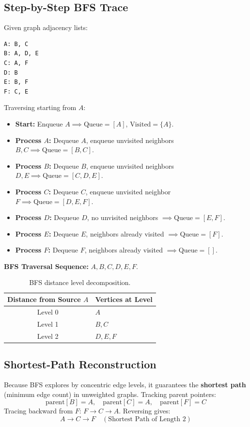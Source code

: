 \subsection{Step-by-Step BFS Trace}
Given graph adjacency lists:
\begin{lstlisting}[style=pseudocode]
A: B, C
B: A, D, E
C: A, F
D: B
E: B, F
F: C, E
\end{lstlisting}
Traversing starting from $A$:
\begin{itemize}
    \item \textbf{Start:} Enqueue $A \implies \text{Queue} = [A]$, $\text{Visited} = \{A\}$.
    \item \textbf{Process $A$:} Dequeue $A$, enqueue unvisited neighbors $B, C \implies \text{Queue} = [B, C]$.
    \item \textbf{Process $B$:} Dequeue $B$, enqueue unvisited neighbors $D, E \implies \text{Queue} = [C, D, E]$.
    \item \textbf{Process $C$:} Dequeue $C$, enqueue unvisited neighbor $F \implies \text{Queue} = [D, E, F]$.
    \item \textbf{Process $D$:} Dequeue $D$, no unvisited neighbors $\implies \text{Queue} = [E, F]$.
    \item \textbf{Process $E$:} Dequeue $E$, neighbors already visited $\implies \text{Queue} = [F]$.
    \item \textbf{Process $F$:} Dequeue $F$, neighbors already visited $\implies \text{Queue} = []$.
\end{itemize}
\textbf{BFS Traversal Sequence:} $\boxed{A, B, C, D, E, F}$.

\begin{table}[htbp]
\centering
\small
\begin{tabular}{c l}
\toprule
\textbf{Distance from Source $A$} & \textbf{Vertices at Level} \\
\midrule
Level 0 & $A$ \\
Level 1 & $B, C$ \\
Level 2 & $D, E, F$ \\
\bottomrule
\end{tabular}
\caption{BFS distance level decomposition.}
\end{table}

\subsection{Shortest-Path Reconstruction}
Because BFS explores by concentric edge levels, it guarantees the \textbf{shortest path} (minimum edge count) in unweighted graphs. Tracking parent pointers:
\[
\text{parent}[B] = A, \quad \text{parent}[C] = A, \quad \text{parent}[F] = C
\]
Tracing backward from $F$: $F \to C \to A$. Reversing gives:
\[
\boxed{A \longrightarrow C \longrightarrow F \quad (\text{Shortest Path of Length 2})}
\]

